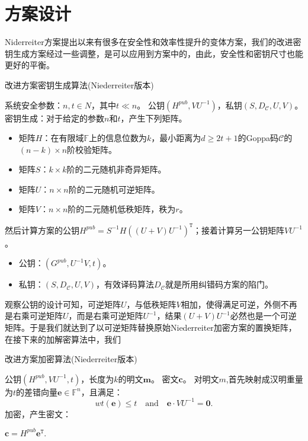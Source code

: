 \section{方案设计}
Niderreiter方案提出以来有很多在安全性和效率性提升的变体方案，我们的改进密钥生成方案经过一些调整，是可以应用到方案中的，由此，安全性和密钥尺寸也能更好的平衡。

\begin{breakablealgorithm}
	\small
	\renewcommand{\algorithmicrequire}{\textbf{Input:}}
	\renewcommand{\algorithmicensure}{\textbf{Output:}}
	\caption{改进方案密钥生成算法(Niederreiter版本)}
	\label{alg:NewKeyGenN}
	\begin{algorithmic}[1]
		\Require
		系统安全参数：$n,t \in N$，其中$t \ll n$。
		\Ensure
		公钥$(H^{pub},VU^{-1})$，私钥$(S,D_\mathcal{C},U,V)$。
		\State
		密钥生成：对于给定的参数$n$和$t$，产生下列矩阵。
		\begin{itemize}
			\item 矩阵$H$：在有限域$\mathbb{F}$上的信息位数为$k$，最小距离为$d \geq 2t + 1$的Goppa码$\mathcal{C}$的$(n - k) \times n$阶校验矩阵。
			\item 矩阵$S$：$k \times k$阶的二元随机非奇异矩阵。
			\item 矩阵$U$：$n \times n$阶的二元随机可逆矩阵。
			\item 矩阵$V$：$n \times n$阶的二元随机低秩矩阵，秩为$r$。
		\end{itemize}
		\State
		然后计算方案的公钥$H^{pub} = S^{-1}H((U + V)U^{-1})^\mathtt{T}$；接着计算另一公钥矩阵$VU^{-1}$。
		\begin{itemize}
			\item 公钥：$(G^{pub},U^{-1}V,t)$。
			\item 私钥：$(S,D_\mathcal{C},U,V)$，有效译码算法$D_\mathcal{C}$就是所用纠错码方案的陷门。
		\end{itemize}
	\end{algorithmic}
\end{breakablealgorithm}

观察公钥的设计可知，可逆矩阵$U$，与低秩矩阵$V$相加，使得满足可逆，外侧不再是右乘可逆矩阵$U$，而是右乘可逆矩阵$U^{-1}$，结果$(U + V)U^{-1}$必然也是一个可逆矩阵。于是我们就达到了以可逆矩阵替换原始Niederreiter加密方案的置换矩阵，在接下来的加解密算法中，我们

\begin{breakablealgorithm}
	\small
	\renewcommand{\algorithmicrequire}{\textbf{Input:}}
	\renewcommand{\algorithmicensure}{\textbf{Output:}}
	\caption{改进方案加密算法(Niederreiter版本)}
	\label{alg:NeweEnN}
	\begin{algorithmic}[1]
		\Require
		公钥$(H^{pub},VU^{-1},t)$，长度为$k$的明文$\mathbf{m}$。
		\Ensure
		密文$\mathbf{c}$。
		\State
		对明文$m$,首先映射成汉明重量为$t$的差错向量$\mathbf{e} \in \mathbb{F}^n$，且满足：
		\begin{equation}
		wt(\mathbf{e})\leq t\quad \mbox{and}\quad \mathbf{e}\cdot VU^{-1} = \mathbf{0}.
		\end{equation}
		\State
		加密，产生密文：
		
		\centering $\mathbf{c} = H^{pub}\mathbf{e}^\mathtt{T}.$
	\end{algorithmic}
\end{breakablealgorithm}

